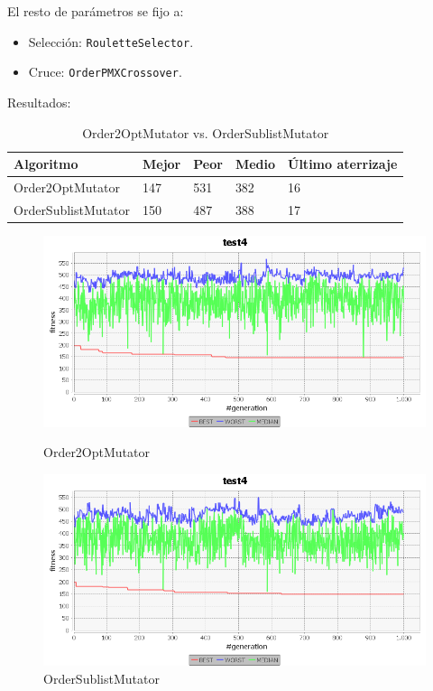\documentclass[a4paper,12pt,titlepage]{article}
\begin{document}
El resto de parámetros se fijo a:

\begin{itemize}[noitemsep]
	\item Selección: \lstinline|RouletteSelector|.
	\item Cruce: \lstinline|OrderPMXCrossover|.
\end{itemize}

Resultados:

\begin{table}[!ht]
\centering
\begin{tabular}{@{}lllll@{}}
\toprule
Algoritmo           & Mejor & Peor & Medio & Último aterrizaje \\ \midrule
Order2OptMutator    & 147   & 531  & 382   & 16                \\
OrderSublistMutator & 150   & 487  & 388   & 17                \\ \bottomrule
\end{tabular}
\caption{Order2OptMutator vs. OrderSublistMutator}
\end{table}

\begin{figure}[!ht]
\centering
\begin{minipage}{.5\textwidth}
  \centering
  \includegraphics[width=\textwidth]{Order2OptMutator.png}
  \caption{Order2OptMutator}
\end{minipage}%
\begin{minipage}{.5\textwidth}
  \centering
  \includegraphics[width=\textwidth]{OrderSublistMutator.png}
  \caption{OrderSublistMutator}
\end{minipage}
\end{figure}
\end{document}
